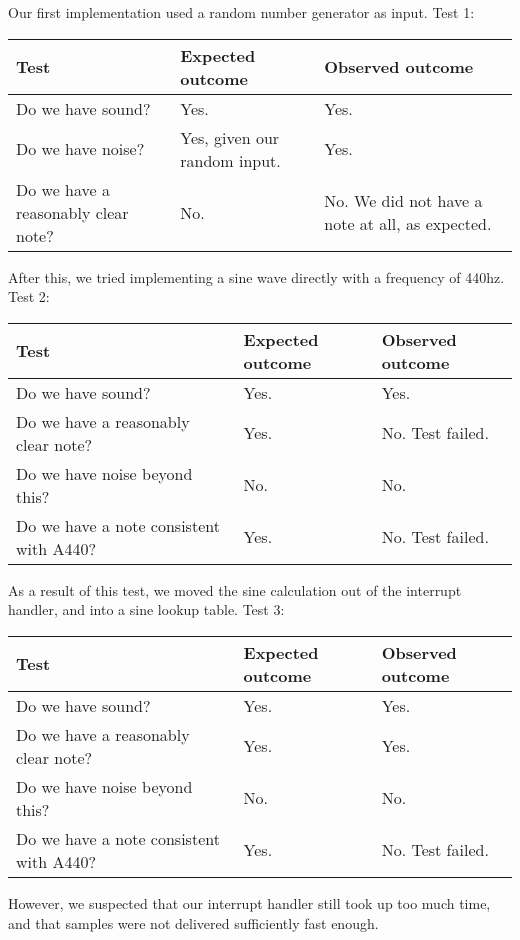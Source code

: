 Our first implementation used a random number generator as input.
Test 1:
\begin{center}
\begin{tabular}{|p{3.6cm}|p{3.6cm}|p{3.6cm}|}
\hline
{\sc Test} & {\sc Expected outcome} & {\sc Observed outcome}\\ \hline
Do we have sound? & Yes. & Yes.\\ \hline
Do we have noise? & Yes, given our random input. & Yes. \\ \hline
Do we have a reasonably clear note? & No. & No. We did not have a note at all, as expected.\\ \hline
\end{tabular}
\end{center}
After this, we tried implementing a sine wave directly with a frequency
of 440hz.
Test 2:
\begin{center}
\begin{tabular}{|p{3.6cm}|p{3.6cm}|p{3.6cm}|}
\hline
{\sc Test} & {\sc Expected outcome} & {\sc Observed outcome}\\ \hline
Do we have sound? & Yes. & Yes. \\ \hline
Do we have a reasonably clear note? & Yes. & No. Test failed. \\ \hline
Do we have noise beyond this? & No. & No. \\ \hline
Do we have a note consistent with A440? & Yes. & No. Test failed. \\
\hline
\end{tabular}
\end{center}

As a result of this test, we moved the sine calculation out of the
interrupt handler, and into a sine lookup table.
Test 3:
\begin{center}
\begin{tabular}{|p{3.6cm}|p{3.6cm}|p{3.6cm}|}
\hline
{\sc Test} & {\sc Expected outcome} & {\sc Observed outcome}\\ \hline
Do we have sound? & Yes. & Yes. \\ \hline
Do we have a reasonably clear note? & Yes. & Yes. \\ \hline
Do we have noise beyond this? & No. & No. \\ \hline
Do we have a note consistent with A440? & Yes. & No. Test failed. \\
\hline
\end{tabular}
\end{center}

However, we suspected that our interrupt handler still took up too much
time, and that samples were not delivered sufficiently fast enough.

